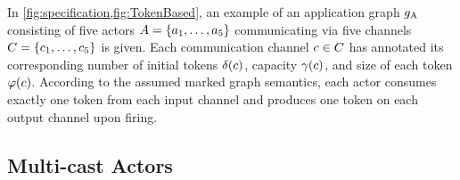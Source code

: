 In \cref{fig:specification,fig:TokenBased}, an example of an application graph $g_\textrm{A}$ consisting of five actors $A=\{a_1,\ldots,a_{5}\}$ communicating via five channels $C=\{c_1,\ldots,c_{5}\}$ is given.
Each communication channel $c \in C$ has annotated its corresponding number of initial tokens $\delta(c)$, capacity $\gamma(c)$, and size of each token $\varphi(c)$.
According to the assumed marked graph semantics, each actor consumes exactly one token from each input channel and produces one token on each output channel upon firing.

\subsection{Multi-cast Actors}\label{sec:multi-cast-actors}

